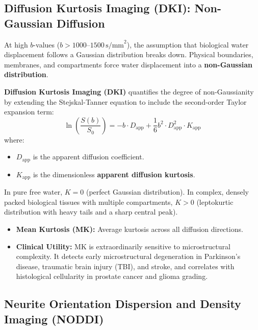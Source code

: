 \documentclass[11pt,a4paper]{article}
\begin{document}
\subsection{Diffusion Kurtosis Imaging (DKI): Non-Gaussian Diffusion}

At high $b$-values ($b > 1000\text{--}1500\,\text{s/mm}^2$), the assumption that biological water displacement follows a Gaussian distribution breaks down. Physical boundaries, membranes, and compartments force water displacement into a \textbf{non-Gaussian distribution}.

\textbf{Diffusion Kurtosis Imaging (DKI)} quantifies the degree of non-Gaussianity by extending the Stejskal-Tanner equation to include the second-order Taylor expansion term:
\begin{equation}
    \ln\left( \frac{S(b)}{S_0} \right) = -b \cdot D_{\text{app}} + \frac{1}{6} b^2 \cdot D_{\text{app}}^2 \cdot K_{\text{app}}
\end{equation}
where:
\begin{itemize}[leftmargin=*]
    \item $D_{\text{app}}$ is the apparent diffusion coefficient.
    \item $K_{\text{app}}$ is the dimensionless \textbf{apparent diffusion kurtosis}.
\end{itemize}
In pure free water, $K = 0$ (perfect Gaussian distribution). In complex, densely packed biological tissues with multiple compartments, $K > 0$ (leptokurtic distribution with heavy tails and a sharp central peak).
\begin{itemize}[leftmargin=*]
    \item \textbf{Mean Kurtosis (MK):} Average kurtosis across all diffusion directions.
    \item \textbf{Clinical Utility:} MK is extraordinarily sensitive to microstructural complexity. It detects early microstructural degeneration in Parkinson's disease, traumatic brain injury (TBI), and stroke, and correlates with histological cellularity in prostate cancer and glioma grading.
\end{itemize}

\subsection{Neurite Orientation Dispersion and Density Imaging (NODDI)}
\end{document}
